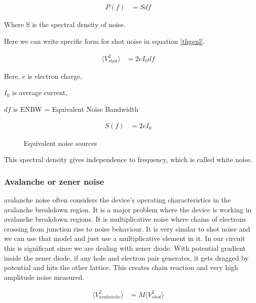 \begin{align}\label{thgenl}
P(f) & = S df
\end{align}

Where S is the spectral density of noise.

Here we can write specific form for shot noise in equation \ref{thgenl}.\cite{campbell1909study}


\begin{align}\label{thshotvo}
\langle V_{shot}^2\rangle & = 2 e I_0 df
\end{align}

Here, $e$ is electron charge,

$I_0$ is average current,

$df$ is ENBW = Equivalent Noise Bandwidth

\begin{align}\label{thshots}
S(f) & = 2 e I_0
\end{align}

\begin{figure}[hbt!]
\label{thnoise}
\caption{Equivalent noise sources}
\end{figure}

This spectral density gives independence to frequency, which is called white noise. 


\subsubsection{Avalanche or zener noise \label{than}}

avalanche noise often considers the device's operating characteristics in the avalanche breakdown region. It is a major problem where the device is working in avalanche breakdown regions. It is multiplicative noise where chains of electrons crossing from junction rise to noise behaviour. It is very similar to shot noise and we can use that model and just use a multiplicative element in it. In our circuit this is significant since we are dealing with zener diode. With potential gradient inside the zener diode, if any hole and electron pair generates, it gets dragged by potential and hits the other lattice. This creates chain reaction and very high amplitude noise measured.


\begin{align*}
\langle V_{avalanche}^2\rangle & = M \langle V_{shot}^2\rangle
\end{align*}

